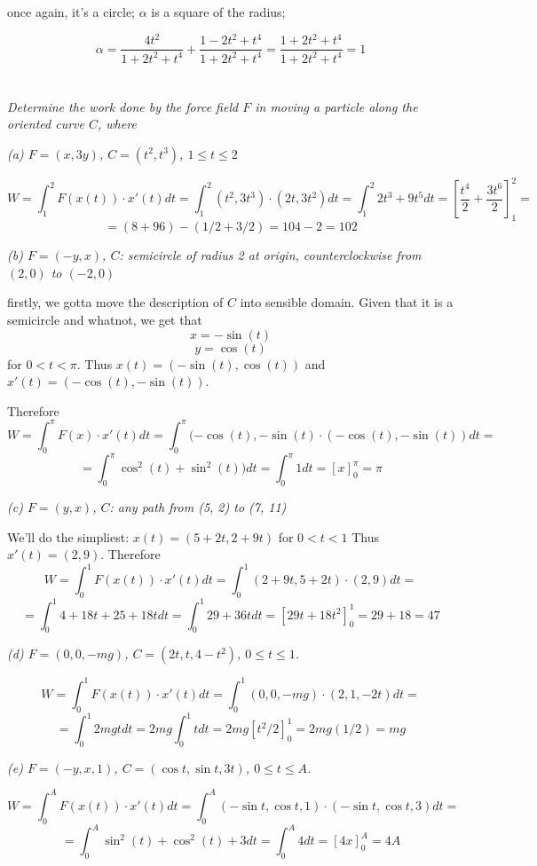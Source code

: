 \documentclass[11pt,oneside,titlepage]{book}
\begin{document}
once again, it's a circle; $\alpha$ is a square of the radius;

$$\alpha = \frac{4t^2}{1 + 2t^2 + t^4} + \frac{1 - 2t^2 + t^4}{1 + 2t^2 + t^4} =
\frac{1 + 2t^2 + t^4}{1 + 2t^2 + t^4} = 1$$

\section{}

\textit{Determine the work done by the force field $F$ in moving a particle along the
  oriented curve $C$, where }

\textit{(a) $F = (x, 3y)$, $C = (t^2, t^3)$, $1 \leq t \leq 2$}

$$W = \int_1^2{F(x(t)) \cdot x'(t)dt} = \int_1^2{(t^2, 3t^3) \cdot (2t, 3t^2)dt} =
\int_1^2{2t^3 + 9t^5dt} = \left[\frac{t^4}{2} + \frac{3t^6}{2}\right]_1^2 =$$
$$=
(8 + 96) - (1/2 + 3/2) = 104 - 2 = 102$$

\textit{(b) $F = (-y, x)$, $C$: semicircle of radius 2 at origin, counterclockwise from
  $(2, 0)$ to $(-2, 0)$}

firstly, we gotta move the description of $C$ into sensible domain.
Given that it is a semicircle and whatnot, we get that
$$x = -\sin(t)$$
$$y = \cos(t)$$
for $0 < t < \pi$. Thus $x(t) = (-\sin(t), \cos(t))$ and $x'(t) = (-\cos(t), -\sin(t))$.

Therefore
$$W = \int_0^\pi{F(x) \cdot x'(t) dt} =
\int_0^\pi{(-\cos(t), -\sin(t) \cdot (-\cos(t), -\sin(t)) dt} =$$
$$ = 
\int_0^\pi{\cos^2(t) + \sin^2(t)) dt} =  \int_0^\pi{ 1 dt} =  [x]_0^\pi = \pi$$

\textit{(c) $F=(y, x)$, $C$: any path from (5, 2) to (7, 11)}

We'll do the simpliest: $x(t) = (5 + 2t, 2 + 9t)$ for $0 < t < 1$
Thus $x'(t) = (2, 9)$. Therefore
$$W = \int_0^1{F(x(t)) \cdot x'(t) dt} =  \int_0^1{(2 + 9t, 5 + 2t) \cdot (2, 9) dt} = $$
$$=
\int_0^1{4 + 18t + 25 + 18t dt} = \int_0^1{29 + 36t dt} = [29t + 18t^2]_0^1 = 29 + 18 = 47$$

\textit{(d) $F = (0, 0, -mg)$, $C = (2t, t, 4 - t^2)$, $0 \leq t \leq 1$.}

$$W = \int_0^1{F(x(t)) \cdot x'(t) dt} =
\int_0^1{(0, 0, -mg) \cdot (2, 1, -2t) dt} =$$
$$ =
\int_0^1{2mgt dt} = 2mg \int_0^1{t dt} = 2mg [t^2/2]_0^1 = 2mg(1/2) = mg$$

\textit{(e) $F = (-y, x, 1)$, $C = (\cos t, \sin t, 3 t)$, $0 \leq t \leq A$.}

$$W = \int_0^A{F(x(t)) \cdot x'(t) dt} =
\int_0^A{(- \sin t, \cos t, 1) \cdot (- \sin t, \cos t, 3) dt} = $$
$$ =
\int_0^A{\sin^2(t) + \cos^2(t) + 3 dt} =
\int_0^A{4 dt} = [4x]_0^A = 4A
$$
\end{document}
